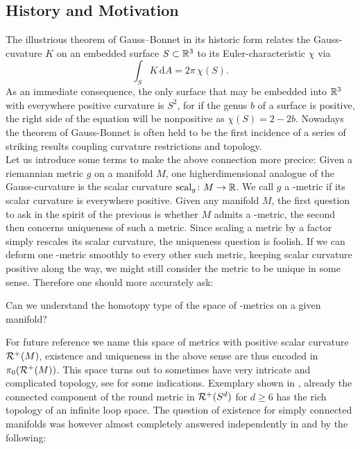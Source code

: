 \subsection*{History and Motivation}
The illustrious theorem of Gauss--Bonnet in its historic form relates  the Gauss-cuvature $K$ on an embedded surface $S\subset \mathbb{R}^3$ to its Euler-characteristic $\chi$ via
\begin{equation*}
\int_S K \,\mathrm{d}A = 2\pi\,\chi(S).
\end{equation*}
As an immediate consequence, the only surface that may be embedded into $\mathbb{R}^3$ with everywhere positive curvature is $S^2$, for if the genus $b$ of a surface is positive, the right side of the equation will be nonpositive as $\chi(S) = 2 - 2b$.
Nowadays the theorem of Gauss-Bonnet is often held to be the first incidence of a series of striking results coupling curvature restrictions and topology.\\
Let us introduce some terms to make the above connection more precice: 
Given a riemannian metric $g$ on a manifold $M$, one higherdimensional analogue of the Gauss-curvature is the scalar curvature $\mathrm{scal}_g\colon M\to \mathbb{R}$.
We call $g$ a \psc-metric if its scalar curvature is everywhere positive.
Given any manifold $M$, the first question to ask in the spirit of the previous is whether $M$ admits a \psc-metric, the second then concerns uniqueness of such a metric.
Since scaling a metric by a factor simply rescales its scalar curvature, the uniqueness question is foolish.
If we can deform one \psc-metric smoothly to every other such metric, keeping scalar curvature positive along the way, we might still consider the metric to be unique in some sense.
Therefore one should more accurately ask:
\begin{q}
    Can we understand the homotopy type of the space of \psc-metrics on a given manifold?
\end{q}\noindent
For future reference we name this space of metrics with positive scalar curvature $\mathcal{R}^+(M)$, existence and uniqueness in the above sense are thus encoded in $\pi_0(\mathcal{R}^+(M))$. 
This space turns out to sometimes have very intricate and complicated topology, see \cite{hanke:psc} for some indications.
Exemplary shown in \cite{erw:psccc}, already the connected component of the round metric in $\mathcal{R}^+(S^d)$ for $d\geq 6$ has the rich topology of an infinite loop space.
The question of existence for simply connected manifolds was however almost completely answered independently in \cite{gl:scpsc} and \cite{sy:scpsc} by the following:

